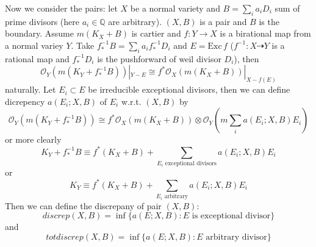 \documentclass{article}
\begin{document}
Now we consider the pairs: let $ X $ be a normal variety and $ B=\sum_ia_iD_i $ sum of prime divisors (here $ a_i\in \mathbb{Q} $ are arbitrary). $ (X,B) $ is a pair and $ B $ is the boundary. Assume $ m(K_X+B) $ is cartier and $ f:Y\to X $ is a birational map from a normal variey $ Y $. Take $ f^{-1}_*B=\sum_ia_if^{-1}_*D_i $ and $ E=\mathrm{Exc}\,f $ ($ f^{-1}:X\dashrightarrow Y $ is a rational map and $ f^{-1}_*D_i $ is the pushforward of weil divisor $ D_i $), then 
$$ \mathcal{O}_Y(m(K_Y+ f^{-1}_*B))|_{Y-E}\cong f^*\mathcal{O}_X(m(K_X+B))|_{X-f(E)} $$
naturally. Let $ E_i\subset E $ be irreducible exceptional divisors, then we can define dicrepency $ a(E_i;X,B) $ of $ E_i $ w.r.t. $ (X,B) $ by
$$ \mathcal{O}_Y(m(K_Y+ f^{-1}_*B))\cong f^*\mathcal{O}_X(m(K_X+B))\otimes\mathcal{O}_Y(m\sum_ia(E_i;X,B)E_i ) $$
or more clearly
$$ K_Y+f^{-1}_*B\equiv f^*(K_X+B)+\sum_{E_i\text{ exceptional divisors}}a(E_i;X,B)E_i $$
or 
$$ K_Y\equiv f^*(K_X+B)+\sum_{E_i\text{ arbitrary}}a(E_i;X,B)E_i $$
Then we can define the discrepany of pair $ (X,B) $:
$$ discrep(X,B)=\inf \{a(E;X,B):E \text{ is exceptional divisor}\} $$
and
$$ totdiscrep(X,B)=\inf \{a(E;X,B):E \text{ arbitrary divisor}\} $$
\end{document}
